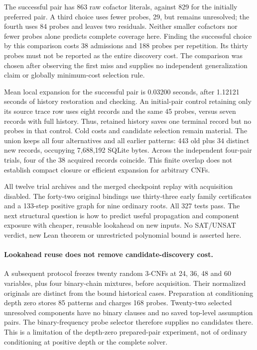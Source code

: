 \documentclass[11pt,a4paper]{article}
\numberwithin{equation}{section}
\theoremstyle{plain}
\theoremstyle{definition}
\theoremstyle{remark}
\begin{document}
The successful pair has 863 raw cofactor literals, against 829 for the initially
preferred pair. A third choice uses fewer probes, 29, but remains unresolved;
the fourth uses 84 probes and leaves two residuals. Neither smaller cofactors nor
fewer probes alone predicts complete coverage here. Finding the successful choice
by this comparison costs 38 admissions and 188 probes per repetition. Its thirty
probes must not be reported as the entire discovery cost. The comparison was
chosen after observing the first miss and supplies no independent generalization
claim or globally minimum-cost selection rule.

Mean local expansion for the successful pair is 0.03200 seconds, after 1.12121
seconds of history restoration and checking. An initial-pair control retaining
only its source trace row uses eight records and the same 45 probes, versus seven
records with full history. Thus, retained history saves one terminal record but
no probes in that control. Cold costs and candidate selection remain material.
The union keeps all four alternatives and all earlier patterns: 443 old plus
34 distinct new records, occupying 7,688,192 SQLite bytes. Across the independent
four-pair trials, four of the 38 acquired records coincide. This finite overlap
does not establish compact closure or efficient expansion for arbitrary CNFs.

All twelve trial archives and the merged checkpoint replay with acquisition
disabled. The forty-two original bindings use thirty-three early family
certificates and a 133-step positive graph for nine ordinary roots. All 327 tests
pass. The next structural question is how to predict useful propagation and
component exposure with cheaper, reusable lookahead on new inputs. No SAT/UNSAT
verdict, new Lean theorem or unrestricted polynomial bound is asserted here.

\paragraph{Lookahead reuse does not remove candidate-discovery cost.}
A subsequent protocol freezes twenty random 3-CNFs at 24, 36, 48 and 60 variables,
plus four binary-chain mixtures, before acquisition. Their normalized originals
are distinct from the bound historical cases. Preparation at conditioning depth
zero stores 85 patterns and charges 168 probes. Twenty-two selected unresolved
components have no binary clauses and no saved top-level assumption pairs. The
binary-frequency probe selector therefore supplies no candidates there. This is
a limitation of the depth-zero prepared-pair experiment, not of ordinary
conditioning at positive depth or the complete solver.
\end{document}
